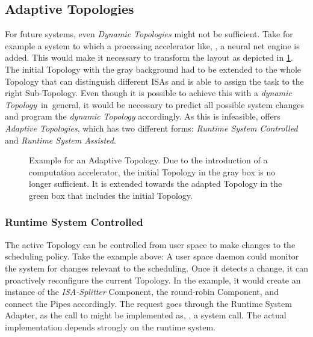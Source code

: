 \subsection{Adaptive Topologies}%
\label{sec:arch:topologies:adative}

For future systems, even \emph{Dynamic Topologies} might not be sufficient. Take for example a system to which a processing accelerator like, \eg{}, a neural net engine is added. This would make it necessary to transform the \cobas{} layout as depicted in \cref{fig:arch:topo_adaptive}. The initial Topology with the gray background had to be extended to the whole Topology that can distinguish different ISAs and is able to assign the task to the right Sub-Topology. Even though it is possible to achieve this with a \emph{dynamic Topology}~in~general, it would be necessary to predict all possible system changes and program the \emph{dynamic Topology} accordingly. As this is infeasible, \cobas{} offers \emph{Adaptive Topologies}, which has two different forms: \emph{Runtime System Controlled} and \emph{Runtime System Assisted}.

\begin{figure}[b!] \centering
	\caption[Example for an Adaptive Topology.]{Example for an Adaptive Topology. Due to the introduction of a computation accelerator, the initial Topology in the gray box is no longer sufficient. It is extended towards the adapted Topology in the green box that includes the initial Topology.}%
	\label{fig:arch:topo_adaptive}
\end{figure}

\subsubsection{Runtime System Controlled}

The active \cobas{} Topology can be controlled from user space to make changes to the scheduling policy. Take the example above: A user space daemon could monitor the system for changes relevant to the scheduling. Once it detects a change, it can proactively reconfigure the current Topology. In the example, it would create an instance of the \emph{ISA-Splitter} Component, the round-robin Component, and connect the Pipes accordingly. The request goes through the Runtime System Adapter, as the call to \cobas{} might be implemented as, \eg{}, a system call. The actual implementation depends strongly on the runtime system.

